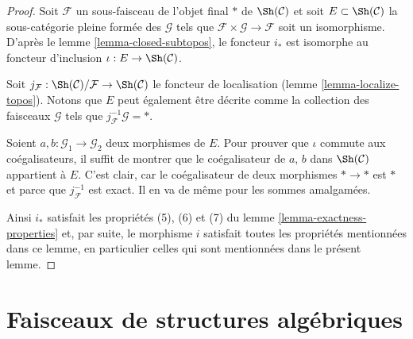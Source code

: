 \begin{proof}
Soit $\mathcal{F}$ un sous-faisceau de l'objet final $*$ de $\Sh(\mathcal{C})$
et soit $E \subset \Sh(\mathcal{C})$ la sous-catégorie pleine formée
des $\mathcal{G}$ tels que
$\mathcal{F} \times \mathcal{G} \to \mathcal{F}$ soit un isomorphisme.
D'après le lemme \ref{lemma-closed-subtopos},
le foncteur $i_*$ est isomorphe au
foncteur d'inclusion $\iota : E \to \Sh(\mathcal{C})$.

\medskip\noindent
Soit $j_{\mathcal{F}} : \Sh(\mathcal{C})/\mathcal{F} \to \Sh(\mathcal{C})$
le foncteur de localisation (lemme \ref{lemma-localize-topos}).
Notons que $E$ peut également être décrite comme
la collection des faisceaux $\mathcal{G}$ tels que
$j_\mathcal{F}^{-1}\mathcal{G} = *$.

\medskip\noindent
Soient $a, b : \mathcal{G}_1 \to \mathcal{G}_2$ deux morphismes de $E$.
Pour prouver que $\iota$ commute aux coégalisateurs, il suffit de montrer que
le coégalisateur de $a$, $b$ dans $\Sh(\mathcal{C})$ appartient à $E$.
C'est clair, car
le coégalisateur de deux morphismes $* \to *$ est $*$ et parce que
$j_\mathcal{F}^{-1}$ est exact. Il en va de même pour les sommes amalgamées.

\medskip\noindent
Ainsi $i_*$ satisfait les propriétés (5), (6) et (7) du
lemme \ref{lemma-exactness-properties} et, par suite,
le morphisme $i$ satisfait toutes les propriétés mentionnées dans ce
lemme, en particulier celles qui sont mentionnées dans le présent lemme.
\end{proof}








\section{Faisceaux de structures algébriques}
\label{section-sheaves-algebraic-structures}

